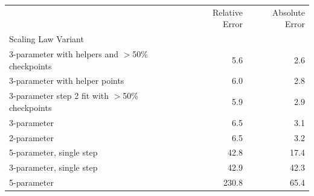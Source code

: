 \begin{tabular}{lrr}
\toprule
 & Relative Error & Absolute Error \\
Scaling Law Variant &  &  \\
\midrule
3-parameter with helpers and $>$50\% checkpoints & 5.6 & 2.6 \\
3-parameter with helper points & 6.0 & 2.8 \\
3-parameter step 2 fit with $>$50\% checkpoints & 5.9 & 2.9 \\
3-parameter & 6.5 & 3.1 \\
2-parameter & 6.5 & 3.2 \\
5-parameter, single step & 42.8 & 17.4 \\
3-parameter, single step & 42.9 & 42.3 \\
5-parameter & 230.8 & 65.4 \\
\bottomrule
\end{tabular}